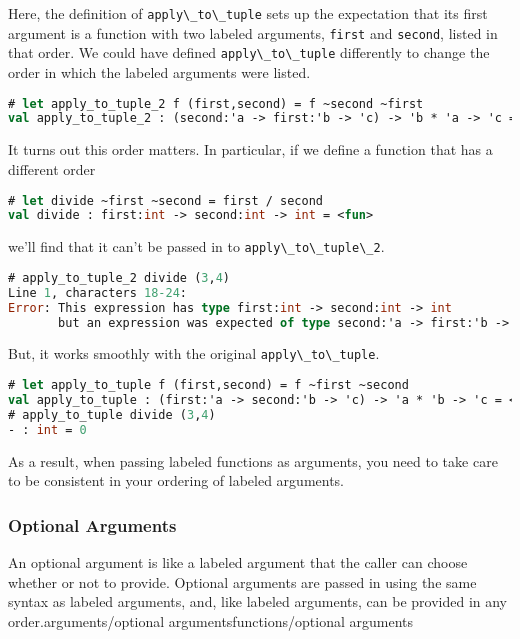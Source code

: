 Here, the definition of \passthrough{\lstinline!apply\_to\_tuple!} sets
up the expectation that its first argument is a function with two
labeled arguments, \passthrough{\lstinline!first!} and
\passthrough{\lstinline!second!}, listed in that order. We could have
defined \passthrough{\lstinline!apply\_to\_tuple!} differently to change
the order in which the labeled arguments were listed.

\begin{lstlisting}[language=Caml]
# let apply_to_tuple_2 f (first,second) = f ~second ~first
val apply_to_tuple_2 : (second:'a -> first:'b -> 'c) -> 'b * 'a -> 'c = <fun>
\end{lstlisting}

It turns out this order matters. In particular, if we define a function
that has a different order

\begin{lstlisting}[language=Caml]
# let divide ~first ~second = first / second
val divide : first:int -> second:int -> int = <fun>
\end{lstlisting}

we'll find that it can't be passed in to
\passthrough{\lstinline!apply\_to\_tuple\_2!}.

\begin{lstlisting}[language=Caml]
# apply_to_tuple_2 divide (3,4)
Line 1, characters 18-24:
Error: This expression has type first:int -> second:int -> int
       but an expression was expected of type second:'a -> first:'b -> 'c
\end{lstlisting}

But, it works smoothly with the original
\passthrough{\lstinline!apply\_to\_tuple!}.

\begin{lstlisting}[language=Caml]
# let apply_to_tuple f (first,second) = f ~first ~second
val apply_to_tuple : (first:'a -> second:'b -> 'c) -> 'a * 'b -> 'c = <fun>
# apply_to_tuple divide (3,4)
- : int = 0
\end{lstlisting}

As a result, when passing labeled functions as arguments, you need to
take care to be consistent in your ordering of labeled arguments.

\hypertarget{optional-arguments}{%
\subsubsection{Optional Arguments}\label{optional-arguments}}

An optional argument is like a labeled argument that the caller can
choose whether or not to provide. Optional arguments are passed in using
the same syntax as labeled arguments, and, like labeled arguments, can
be provided in any
order.\protect\hypertarget{ARGopt}{}{arguments/optional
arguments}\protect\hypertarget{FNCopt}{}{functions/optional arguments}

